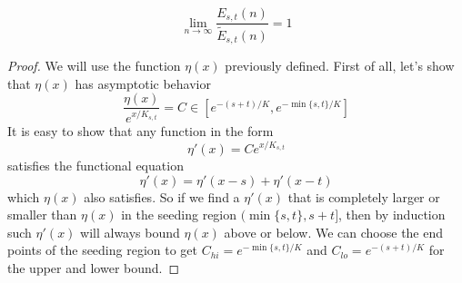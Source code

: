\documentclass[]{article}
\begin{document}
\vspace{1cm}
\begin{lemma}[$E$ limit]
	\[
	\lim_{n\to\infty}\frac{E_{s,t}(n)}{\tilde{E}_{s,t}(n)} = 1
	\]
\end{lemma}
\begin{proof}
	
	We will use the function $\eta(x)$ previously defined. First of all, let's show that $\eta(x)$ has asymptotic behavior
	\[
	\frac{\eta(x)}{e^{x/K_{s,t}}} = C \in [e^{-(s+t)/K},e^{-\min\{s,t\}/K}]
	\]
	It is easy to show that any function in the form 
	\[
	\eta'(x) = C e^{x/K_{s,t}}
	\]
	satisfies the functional equation 
	\[
	\eta'(x) = \eta'(x - s) + \eta'(x - t)
	\]
	which $\eta(x)$ also satisfies. So if we find a $\eta'(x)$ that is completely larger or smaller than $\eta(x)$ in the seeding region $(\min\{s,t\}, s+t]$, then by induction such $\eta'(x)$ will always bound $\eta(x)$ above or below. We can choose the end points of the seeding region to get $C_{hi} = e^{-\min\{s,t\}/K}$ and $C_{lo} = e^{-(s+t)/K}$ for the upper and lower bound.
	

\end{proof}
\end{document}
